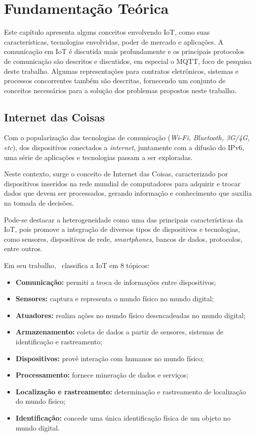 \chapter{Fundamentação Teórica}\label{capitulo:fundamentacao}

Este capítulo apresenta alguns conceitos envolvendo IoT, como suas características, tecnologias envolvidas, poder de mercado e aplicações. A comunicação em IoT é discutida mais profundamente e os principais protocolos de comunicação são descritos e discutidos, em especial o MQTT, foco de pesquisa deste trabalho. Algumas representações para contratos eletrônicos, sistemas e processos concorrentes também são descritas, fornecendo um conjunto de conceitos necessários para a solução dos problemas propostos neste trabalho.

\section{Internet das Coisas}

Com o popularização das tecnologias de comunicação (\textit{Wi-Fi, \textit{Bluetooth}, 3G/4G, etc}), dos dispositivos conectados a \textit{internet}, juntamente com a difusão do IPv6, uma série de aplicações e tecnologias passam a ser exploradas.

Neste contexto, surge o conceito de Internet das Coisas, caracterizado por dispositivos inseridos na rede mundial de computadores para adquirir e trocar dados que devem ser processados, gerando informação e conhecimento que auxilia na tomada de decisões. 

Pode-se destacar a heterogeneidade como uma das principais características da IoT, pois promove a integração de diversos tipos de dispositivos e tecnologias, como sensores, dispositivos de rede, \textit{smartphones}, bancos de dados, protocolos, entre outros.

Em seu trabalho,~\citeauthor{mayer2009security} classifica a IoT em 8 tópicos:

\begin{itemize}
    \item \textbf{Comunicação:} permiti a troca de informações entre dispositivos;
    \item \textbf{Sensores:} captura e representa o mundo físico no mundo digital;
    \item \textbf{Atuadores:} realiza ações no mundo físico desencadeadas no mundo digital;
    \item \textbf{Armazenamento:} coleta de dados a partir de sensores, sistemas de identificação e rastreamento;
    \item \textbf{Dispositivos:} provê interação com humanos no mundo físico;
    \item \textbf{Processamento:} fornece mineração de dados e serviços;
    \item \textbf{Localização e rastreamento:} determinação e rastreamento de localização do mundo físico;
    \item \textbf{Identificação:} concede uma única identificação física de um objeto no mundo digital.
\end{itemize}

